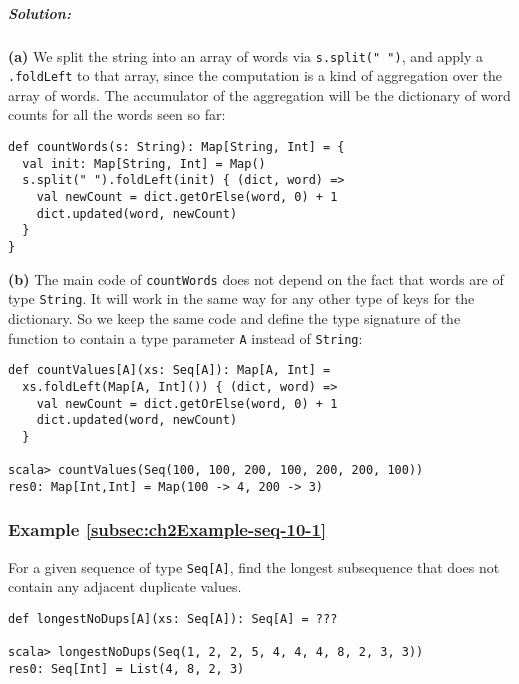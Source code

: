 \subparagraph{Solution:}

\textbf{(a)} We split the string into an array of words via \lstinline!s.split(" ")!,
and apply a \lstinline!.foldLeft!
to that array, since the computation is a kind of aggregation over
the array of words. The accumulator of the aggregation will be the
dictionary of word counts for all the words seen so far:
\begin{lstlisting}
def countWords(s: String): Map[String, Int] = {
  val init: Map[String, Int] = Map()
  s.split(" ").foldLeft(init) { (dict, word) =>
    val newCount = dict.getOrElse(word, 0) + 1
    dict.updated(word, newCount)
  }
}
\end{lstlisting}
\textbf{(b)} The main code of \lstinline!countWords!
does not depend on the fact that words are of type \lstinline!String!.
It will work in the same way for any other type of keys for the dictionary.
So we keep the same code and define the type signature of the function
to contain a type parameter \lstinline!A!
instead of \lstinline!String!:
\begin{lstlisting}
def countValues[A](xs: Seq[A]): Map[A, Int] =
  xs.foldLeft(Map[A, Int]()) { (dict, word) =>
    val newCount = dict.getOrElse(word, 0) + 1
    dict.updated(word, newCount)
  }

scala> countValues(Seq(100, 100, 200, 100, 200, 200, 100))
res0: Map[Int,Int] = Map(100 -> 4, 200 -> 3)
\end{lstlisting}

\subsubsection{Example \label{subsec:ch2Example-seq-10-1}\ref{subsec:ch2Example-seq-10-1}}

For a given sequence of type \lstinline!Seq[A]!,
find the longest subsequence that does not contain any adjacent duplicate
values.

\begin{lstlisting}
def longestNoDups[A](xs: Seq[A]): Seq[A] = ???

scala> longestNoDups(Seq(1, 2, 2, 5, 4, 4, 4, 8, 2, 3, 3))
res0: Seq[Int] = List(4, 8, 2, 3)
\end{lstlisting}

